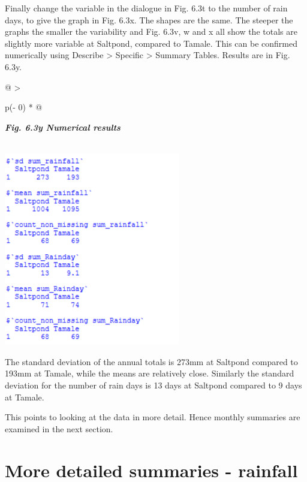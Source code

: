 \documentclass[
  letterpaper,
  DIV=11,
  numbers=noendperiod]{scrreprt}
\begin{document}
Finally change the variable in the dialogue in Fig. 6.3t to the number
of rain days, to give the graph in Fig. 6.3x. The shapes are the same.
The steeper the graphs the smaller the variability and Fig. 6.3v, w and
x all show the totals are slightly more variable at Saltpond, compared
to Tamale. This can be confirmed numerically using Describe
\textgreater{} Specific \textgreater{} Summary Tables. Results are in
Fig. 6.3y.

\begin{longtable}[]{@{}
  >{\raggedright\arraybackslash}p{(\columnwidth - 0\tabcolsep) * }@{}}
\toprule\noalign{}
\begin{minipage}[b]{\linewidth}\raggedright
\textbf{\emph{Fig. 6.3y Numerical results}}
\end{minipage} \\
\midrule\noalign{}
\endhead
\bottomrule\noalign{}
\endlastfoot
\includegraphics[width=3.02099in,height=3.32656in]{figures/Fig6.3y.png} \\
\end{longtable}

The standard deviation of the annual totals is 273mm at Saltpond
compared to 193mm at Tamale, while the means are relatively close.
Similarly the standard deviation for the number of rain days is 13 days
at Saltpond compared to 9 days at Tamale.

This points to looking at the data in more detail. Hence monthly
summaries are examined in the next section.

\section{More detailed summaries -
rainfall}\label{more-detailed-summaries---rainfall}
\end{document}
